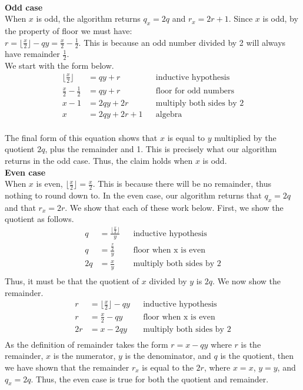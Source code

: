 \documentclass{article}
\begin{document}
\begin{enumerate}
	\\ \textbf{Odd case}
	\\ When $x$ is odd, the algorithm returns $q_x=2q$ and $r_x=2r+1$. Since $x$ is odd, by the property of floor we must have:
	\\ $r = \lfloor{\frac{x}{2}}\rfloor-qy=\frac{x}{2}-\frac{1}{2}$. This is because an odd number divided by 2 will always have remainder $\frac{1}{2}$.
	\\ We start with the form below.
	\begin{align}
		\lfloor{\frac{x}{2}}\rfloor&=qy+r && \text{inductive hypothesis} \\
		\frac{x}{2}-\frac{1}{2}&=qy+r && \text{floor for odd numbers} \\
		x-1 &= 2qy+2r && \text{multiply both sides by 2} \\
		x &= 2qy + 2r + 1 && \text{algebra}
	\end{align}
	\\ The final form of this equation shows that $x$ is equal to $y$ multiplied by the quotient $2q$, plus the remainder and 1. This is precisely what our algorithm returns in the odd case. Thus, the claim holds when $x$ is odd.
	\\ \textbf{Even case}
	\\ When $x$ is even, $\lfloor{\frac{x}{2}}\rfloor=\frac{x}{2}$. This is because there will be no remainder, thus nothing to round down to. In the even case, our algorithm returns that $q_x=2q$ and that $r_x=2r$. We show that each of these work below. First, we show the quotient as follows.
	\begin{align}
		q&=\frac{\lfloor{\frac{x}{2}}\rfloor}{y} && \text{inductive hypothesis} \\
		q&=\frac{\frac{x}{2}}{y} && \text{floor when x is even} \\
		2q&=\frac{x}{y} && \text{multiply both sides by 2} \\
	\end{align}
	Thus, it must be that the quotient of $x$ divided by $y$ is $2q$. We now show the remainder.
	\begin{align}
	r &= \lfloor{\frac{x}{2}}\rfloor - qy && \text{inductive hypothesis} \\
	r &= \frac{x}{2}-qy && \text{floor when x is even} \\
	2r &= x-2qy && \text{multiply both sides by 2} \\
\end{align}
	As the definition of remainder takes the form $r=x-qy$ where $r$ is the remainder, $x$ is the numerator, $y$ is the denominator, and $q$ is the quotient, then we have shown that the remainder $r_x$ is equal to the $2r$, where $x=x$, $y=y$, and $q_x=2q$. Thus, the even case is true for both the quotient and remainder.

\end{enumerate}
\end{document}
